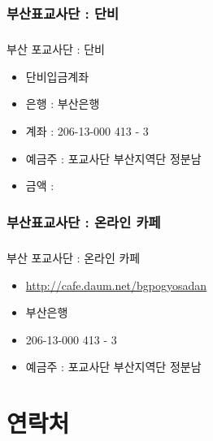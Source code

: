 \documentclass[aspectratio=1610,14pt,xcolor=pdftex,dvipsnames,table,handout]{beamer}
\begin{document}
		\section{ 부산표교사단 : 단비 }
		\begin{frame} [t,plain]
		\frametitle{ }
			\begin{block} { 부산 포교사단 : 단비 }
			\setlength{\leftmargini}{3em}			
			\begin{itemize}
			\item 단비입금계좌 
			\item 은행 : 부산은행
			\item 계좌 : 206-13-000 413 - 3
			\item 예금주 : 포교사단 부산지역단 정분남
			\item 금액 : 
			\end{itemize}
			\end{block}						
		\end{frame}						


		\section{ 부산표교사단 : 온라인 카페 }
		\begin{frame} [t,plain]
		\frametitle{ }
			\begin{block} { 부산 포교사단 : 온라인 카페 }
			\setlength{\leftmargini}{3em}			
			\begin{itemize}
			\item \url{http://cafe.daum.net/bgpogyosadan}
			\item 부산은행
			\item 206-13-000 413 - 3
			\item 예금주 : 포교사단 부산지역단 정분남
			\end{itemize}
			\end{block}						
		\end{frame}						



		\part{ 연락처 }
		\frame{\partpage}
\end{document}

